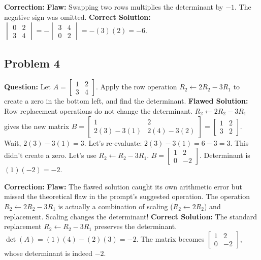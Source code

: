 \documentclass{article}
\begin{document}
\textbf{Correction:}
\textbf{Flaw:} Swapping two rows multiplies the determinant by $-1$. The negative sign was omitted.
\textbf{Correct Solution:} $\begin{vmatrix} 0 & 2 \\ 3 & 4 \end{vmatrix} = - \begin{vmatrix} 3 & 4 \\ 0 & 2 \end{vmatrix} = - (3)(2) = -6$.

\subsection{Problem 4}
\textbf{Question:} Let $A = \begin{bmatrix} 1 & 2 \\ 3 & 4 \end{bmatrix}$. Apply the row operation $R_2 \leftarrow 2R_2 - 3R_1$ to create a zero in the bottom left, and find the determinant.
\textbf{Flawed Solution:}
Row replacement operations do not change the determinant.
$R_2 \leftarrow 2R_2 - 3R_1$ gives the new matrix $B = \begin{bmatrix} 1 & 2 \\ 2(3)-3(1) & 2(4)-3(2) \end{bmatrix} = \begin{bmatrix} 1 & 2 \\ 3 & 2 \end{bmatrix}$.
Wait, $2(3)-3(1) = 3$. Let's re-evaluate: $2(3) - 3(1) = 6 - 3 = 3$. This didn't create a zero.
Let's use $R_2 \leftarrow R_2 - 3R_1$.
$B = \begin{bmatrix} 1 & 2 \\ 0 & -2 \end{bmatrix}$.
Determinant is $(1)(-2) = -2$.

\textbf{Correction:}
\textbf{Flaw:} The flawed solution caught its own arithmetic error but missed the theoretical flaw in the prompt's suggested operation. The operation $R_2 \leftarrow 2R_2 - 3R_1$ is actually a combination of scaling ($R_2 \leftarrow 2R_2$) and replacement. Scaling changes the determinant!
\textbf{Correct Solution:} The standard replacement $R_2 \leftarrow R_2 - 3R_1$ preserves the determinant. $\det(A) = (1)(4) - (2)(3) = -2$. The matrix becomes $\begin{bmatrix} 1 & 2 \\ 0 & -2 \end{bmatrix}$, whose determinant is indeed $-2$.
\end{document}
